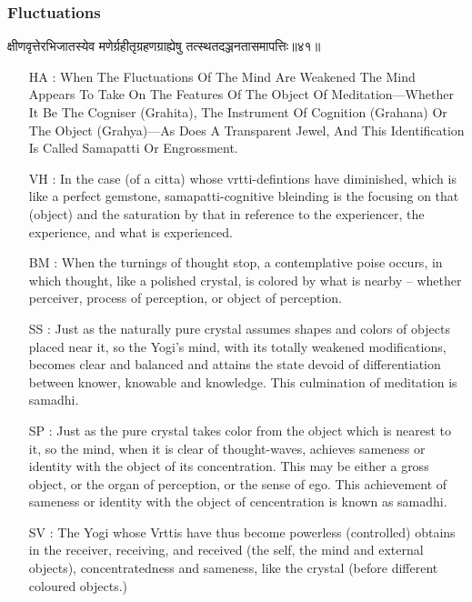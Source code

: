\begin{frame}[fragile]\frametitle{Fluctuations}
\begin{sanskrit}
क्षीणवृत्तेरभिजातस्येव मणेर्ग्रहीतृग्रहणग्राह्येषु तत्स्थतदञ्जनतासमापत्तिः॥४१॥
\end{sanskrit}

	\begin{itemize}
	\item [HA]: When The Fluctuations Of The Mind Are Weakened The Mind Appears To Take On The Features Of The Object Of Meditation—Whether It Be The Cogniser (Grahita), The Instrument Of Cognition (Grahana) Or The Object (Grahya)—As Does A Transparent Jewel, And This Identification Is Called Samapatti Or Engrossment.
	\item [VH]: In the case (of a citta) whose vrtti-defintions have diminished, which is like a perfect gemstone, samapatti-cognitive bleinding is the focusing on that (object) and the saturation by that in reference to the experiencer, the experience, and what is experienced.
	\item [BM]: When the turnings of thought stop, a contemplative poise occurs, in which thought, like a polished crystal, is colored by what is nearby – whether perceiver, process of perception, or object of perception.
	\item [SS]: Just as the naturally pure crystal assumes shapes and colors of objects placed near it, so the Yogi’s mind, with its totally weakened modifications, becomes clear and balanced and attains the state devoid of differentiation between knower, knowable and knowledge. This culmination of meditation is samadhi.
	\item [SP]: Just as the pure crystal takes color from the object which is nearest to it, so the mind, when it is clear of thought-waves, achieves sameness or identity with the object of its concentration. This may be either a gross object, or the organ of perception, or the sense of ego. This achievement of sameness or identity with the object of cencentration is known as samadhi.
	\item [SV]: The Yogi whose Vrttis have thus become powerless (controlled) obtains in the receiver, receiving, and received (the self, the mind and external objects), concentratedness and sameness, like the crystal (before different coloured objects.) 
	\end{itemize}
\end{frame}


